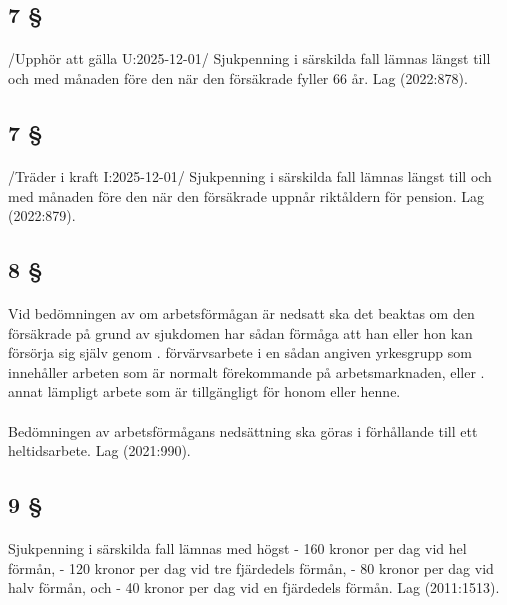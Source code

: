 \documentclass[a4paper,notitlepage,openany,10pt]{book}
\begin{document}
\subsection*{7 §}
\paragraph*{}
/Upphör att gälla U:2025-12-01/
Sjukpenning i särskilda fall lämnas längst till och med månaden före den när den försäkrade fyller 66 år.
Lag (2022:878).
\subsection*{7 §}
\paragraph*{}
/Träder i kraft I:2025-12-01/
Sjukpenning i särskilda fall lämnas längst till och med månaden före den när den försäkrade uppnår riktåldern för pension.
Lag (2022:879).
\subsection*{8 §}
\paragraph*{}
Vid bedömningen av om arbetsförmågan är nedsatt ska det beaktas om den försäkrade på grund av sjukdomen har sådan förmåga att han eller hon kan försörja sig själv genom
. förvärvsarbete i en sådan angiven yrkesgrupp som innehåller arbeten som är normalt förekommande på arbetsmarknaden, eller
. annat lämpligt arbete som är tillgängligt för honom eller henne.
\paragraph*{}
Bedömningen av arbetsförmågans nedsättning ska göras i förhållande till ett heltidsarbete.
Lag (2021:990).
\subsection*{9 §}
\paragraph*{}
Sjukpenning i särskilda fall lämnas med högst
\newline - 160 kronor per dag vid hel förmån,
\newline - 120 kronor per dag vid tre fjärdedels förmån,
\newline - 80 kronor per dag vid halv förmån, och
\newline - 40 kronor per dag vid en fjärdedels förmån.
Lag (2011:1513).
\end{document}
